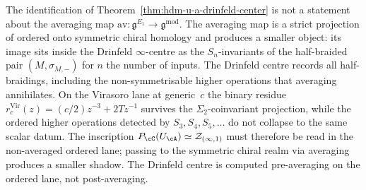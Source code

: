 \begin{remark}
\label{rem:hdm-drinfeld-not-averaging}
The identification of Theorem~\ref{thm:hdm-u-a-drinfeld-center}
is not a statement about the averaging map
$\mathrm{av}\colon \mathfrak g^{E_1}\to \mathfrak g^{\mathrm{mod}}$.
The averaging map is a strict projection of ordered onto symmetric
chiral homology and produces a smaller object: its image sits inside
the Drinfeld $\infty$-centre as the $S_n$-invariants of the
half-braided pair $(M,\sigma_{M,-})$ for $n$ the number of inputs.
The Drinfeld centre records all half-braidings, including the
non-symmetrisable higher operations that averaging annihilates. On
the Virasoro lane at generic~$c$ the binary residue
$r^{\mathrm{Vir}}_c(z)=(c/2)z^{-3}+2Tz^{-1}$ survives the
$\Sigma_2$-coinvariant projection, while the ordered higher
operations detected by $S_3,S_4,S_5,\ldots$ do not collapse to the
same scalar datum. The inscription
$P_\cC(U_\cA)\simeq \mathcal Z_{(\infty,1)}$ must therefore be read in
the non-averaged ordered lane; passing to the symmetric chiral realm
via averaging produces a smaller shadow. The Drinfeld centre is
computed pre-averaging on the ordered lane, not post-averaging.
\end{remark}

